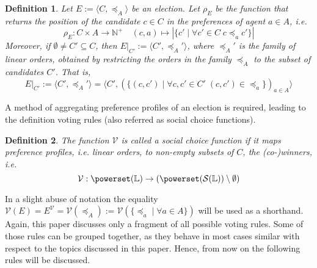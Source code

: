 \documentclass[11pt,a4paper]{article}
\newtheorem{mydef}{Definition}
\newcommand{\pref}{\preceq}
\begin{document}
\begin{mydef}
\label{def:support}
Let $E := \langle C, \pref_A\rangle$ be an election. Let $\rho_E$ be the function that returns the position of the candidate $c\in C$ in the preferences of agent $a \in A$, i.e.
\begin{equation*}
\rho_E: C \times A \to \mathbb{N}^+ \quad (c,a) \mapsto |\{c' \mid \forall c' \in C \; c \pref_a c'\}|
\end{equation*}
Moreover,  if $\emptyset \neq C' \subseteq C$, then $E|_{C'}:= \langle C' , \pref_A'\rangle$, where $ \pref_A'$ is the family of linear orders, obtained by restricting the orders in the family $\pref_A$ to the subset of candidates $C'$. That is,
\begin{equation*}
E|_{C'}:= \langle C' , \pref_A'\rangle = \langle C' ,  (\{ (c, c')  \mid \forall c, c' \in C' \; ( c , c') \in \pref_a\})_{a \in A} \rangle 
\end{equation*}
\end{mydef} 
 
A method of aggregating  preference profiles of an election is required, leading to the definition voting rules  (also referred as social choice functions). 
\begin{mydef}
\label{def:voting_rules_general}
The function $\mathcal{V}$ is called a \emph{social choice function} if it maps preference profiles, i.e. linear orders, to non-empty subsets of $C$, the (co-)winners, i.e.
\begin{equation*}
\mathcal{V}:\powerset(\mathbb{L}) \to( \powerset(\mathcal{S}(\mathbb{L})) \setminus \emptyset)
\end{equation*}

\end{mydef} 
In a slight abuse of notation the equality $\mathcal{V}(E)=E^\mathcal{V}=\mathcal{V}(\pref_A):=\mathcal{V}(\{ \pref_a \mid \forall a \in A \})$ will be used as a shorthand.\\

Again, this paper discusses only a fragment of all possible voting rules. Some of those rules can be grouped together, as they behave in most cases similar with respect to the topics discussed in this paper. Hence, from now on the following rules will be discussed.
\end{document}
